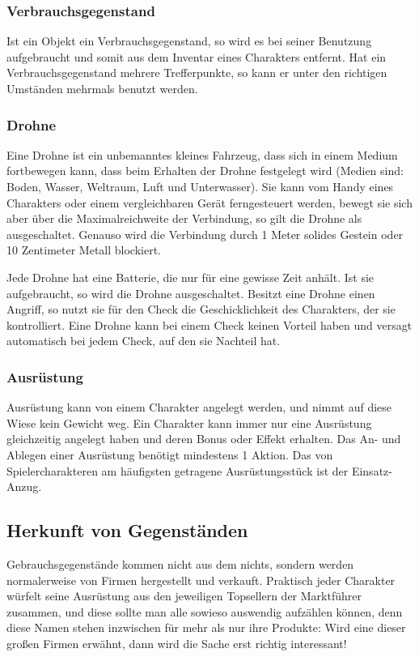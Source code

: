 \subsubsection{Verbrauchsgegenstand}
Ist ein Objekt ein Verbrauchsgegenstand, so wird es bei seiner Benutzung aufgebraucht und somit aus dem Inventar eines Charakters entfernt. Hat ein Verbrauchsgegenstand mehrere Trefferpunkte, so kann er unter den richtigen Umständen mehrmals benutzt werden.
\subsubsection{Drohne}
Eine Drohne ist ein unbemanntes kleines Fahrzeug, dass sich in einem Medium fortbewegen kann, dass beim Erhalten der Drohne festgelegt wird (Medien sind: Boden, Wasser, Weltraum, Luft und Unterwasser). Sie kann vom Handy eines Charakters oder einem vergleichbaren Gerät ferngesteuert werden, bewegt sie sich aber über die Maximalreichweite der Verbindung, so gilt die Drohne als ausgeschaltet. Genauso wird die Verbindung durch 1 Meter solides Gestein oder 10 Zentimeter Metall blockiert.

Jede Drohne hat eine Batterie, die nur für eine gewisse Zeit anhält. Ist sie aufgebraucht, so wird die Drohne ausgeschaltet. Besitzt eine Drohne einen Angriff, so nutzt sie für den Check die Geschicklichkeit des Charakters, der sie kontrolliert. Eine Drohne kann bei einem Check keinen Vorteil haben und versagt automatisch bei jedem Check, auf den sie Nachteil hat.
\subsubsection{Ausrüstung}
Ausrüstung kann von einem Charakter angelegt werden, und nimmt auf diese Wiese kein Gewicht weg. Ein Charakter kann immer nur eine Ausrüstung gleichzeitig angelegt haben und deren Bonus oder Effekt erhalten. Das An- und Ablegen einer Ausrüstung benötigt mindestens 1 Aktion.
Das von Spielercharakteren am häufigsten getragene Ausrüstungsstück ist der Einsatz-Anzug.
\subsection{Herkunft von Gegenständen}
Gebrauchsgegenstände kommen nicht aus dem nichts, sondern werden normalerweise von Firmen hergestellt und verkauft. Praktisch jeder Charakter würfelt seine Ausrüstung aus den jeweiligen Topsellern der Marktführer zusammen, und diese sollte man alle sowieso auswendig aufzählen können, denn diese Namen stehen inzwischen für mehr als nur ihre Produkte: Wird eine dieser großen Firmen erwähnt, dann wird die Sache erst richtig interessant!

